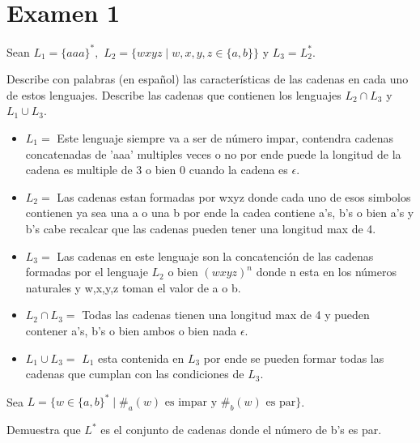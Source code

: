\renewcommand{\labelenumi}{\alph{enumi})}

\section*{Examen 1}

\begin{questions}
\question Sean $L_{1} = \{aaa\}^{*},$ $L_{2} = \{wxyz \mid w,x,y,z \in \{a,b\} \}$ y $L_{3} = L_{2}^{*}$.

Describe con palabras (en español) las características de las cadenas en cada uno de estos lenguajes.
Describe las cadenas que contienen los lenguajes $L_{2} \cap L_{3}$ y $L_{1} \cup L_{3}$.

\begin{solution}
    \begin{itemize}
        \item $L_{1} =$ Este lenguaje siempre va a ser de n\'umero impar, contendra
        cadenas concatenadas de 'aaa' multiples veces o no por ende puede la longitud de la cadena es multiple de 3 o bien 0 cuando la cadena es $\epsilon$.

        \item $L_{2} =$ Las cadenas estan formadas por wxyz donde cada uno de esos simbolos contienen ya sea una a o una b por ende la cadea contiene a's, b's o bien a's y b's cabe recalcar que 
        las cadenas pueden tener una longitud max de 4.
        \item $L_{3} =$ Las cadenas en este lenguaje son la concatención de las cadenas formadas por el 
        lenguaje $L_{2}$ o bien $(wxyz)^{n}$ donde n esta en los n\'umeros naturales y w,x,y,z toman el valor de a o b.
        \item $L_{2} \cap L_{3} = $ Todas las cadenas tienen una longitud max de 4 y pueden contener a's, b's o bien ambos o bien nada $\epsilon$.

        \item $L_{1} \cup L_{3} = $ $L_{1}$ esta contenida en $L_{3}$ por ende se pueden formar todas las cadenas que 
        cumplan con las condiciones de $L_{3}$.

    \end{itemize}
    
    
\end{solution} 
\question Sea $L = \{w \in \{a,b\}^{*} \mid \#_{a}(w) \text{ es impar y } \#_{b} (w) \text{ es par} \}$.

Demuestra que $L^{*}$ es el conjunto de cadenas donde el n\'umero de b's es par.


\end{questions}
